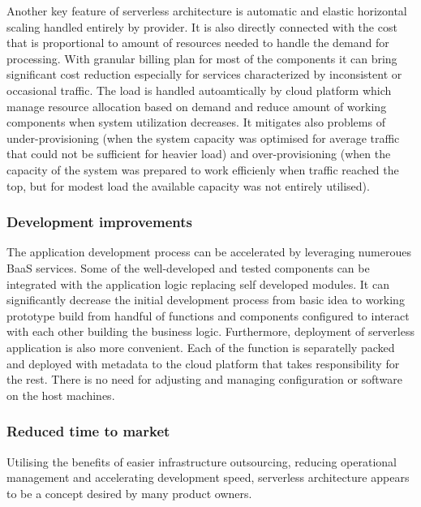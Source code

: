 Another key feature of serverless architecture is automatic and elastic horizontal scaling handled entirely by provider. 
It is also directly connected with the cost that is proportional to amount of resources needed to handle the demand for processing. 
With granular billing plan for most of the components it can bring significant cost reduction especially for services characterized by inconsistent or occasional traffic.
The load is handled autoamtically by cloud platform which manage resource allocation based on demand and reduce amount of working components when system utilization decreases. 
It mitigates also problems of under-provisioning (when the system capacity was optimised for average traffic that could not be sufficient for heavier load) and over-provisioning (when the capacity of the system was prepared to work efficienly when traffic reached the top, but for modest load the available capacity was not entirely utilised).


\subsubsection*{Development improvements}

The application development process can be accelerated by leveraging numeroues BaaS services. Some of the well-developed and tested components can be integrated with the application logic replacing self developed modules. 
It can significantly decrease the initial development process from basic idea to working prototype build from handful of functions and components configured to interact with each other building the business logic. 
Furthermore, deployment of serverless application is also more convenient. Each of the function is separatelly packed and deployed with metadata to the cloud platform that takes responsibility for the rest. There is no need for adjusting and managing configuration or software on the host machines.

\subsubsection*{Reduced time to market}

Utilising the benefits of easier infrastructure outsourcing, reducing operational management and accelerating development speed, serverless architecture appears to be a concept desired by many product owners. 

